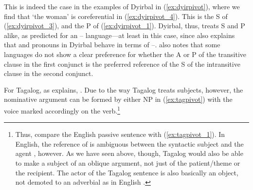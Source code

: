 This is indeed the case in the examples of Dyirbal in (\ref{ex:dyirpivot}),
where we find that  `the woman' is coreferential in
(\ref{ex:dyirpivot_4}). This is the S of (\ref{ex:dyirpivot_3}), and the P of
(\ref{ex:dyirpivot_1}). Dyirbal, thus, treats S and P alike, as predicted for
an \Erg{}--\Abs{} language---at least in this case, since
\citet[113]{comrie1989} also explains that \Fsg{} and \Ssg{} pronouns in
Dyirbal behave in terms of \Nom{}--\Acc{}. \citet{comrie1989} also notes that
some languages do not show a clear preference for whether the A or P of the
transitive clause in the first conjunct is the preferred reference of the S of
the intransitive clause in the second conjunct.

For Tagalog, as \citet{kroeger1991} explains, . Due to the way
Tagalog treats subjects, however, the nominative argument can be formed by
either NP in (\ref{ex:tagpivot}) with the voice marked accordingly on the
verb.\footnote{Thus, compare the English passive sentence  with (\ref{ex:tagpivot_1}). In English,
the reference of  is ambiguous between the syntactic subject 
and the agent , however. As we have seen above, though, Tagalog would
also be able to make a subject of an oblique argument, not just of the
patient/theme or the recipient. The actor of the Tagalog sentence is also
basically an object, not demoted to an adverbial as in English
\citep[38--44]{kroeger1991}.}

